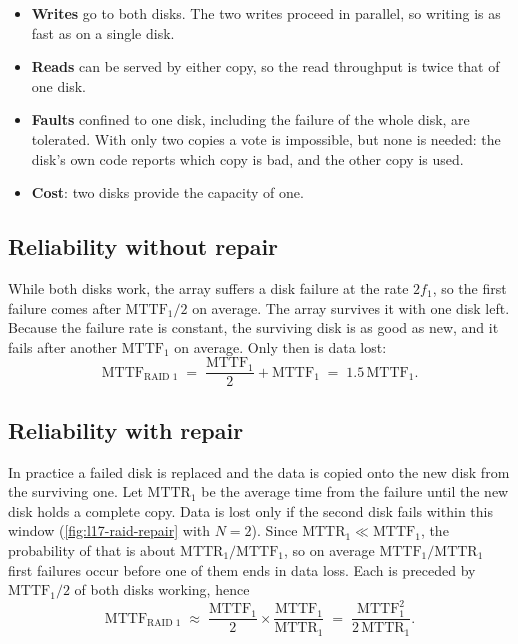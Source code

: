 \documentclass[../main.tex]{subfiles}
\begin{document}
\begin{itemize}
  \item \textbf{Writes} go to both disks.  The two writes proceed in parallel,
    so writing is as fast as on a single disk.
  \item \textbf{Reads} can be served by either copy, so the read throughput
    is twice that of one disk.
  \item \textbf{Faults} confined to one disk, including the failure of the
    whole disk, are tolerated.  With only two copies a vote is impossible,
    but none is needed: the disk's own code reports which copy is bad, and
    the other copy is used.
  \item \textbf{Cost}: two disks provide the capacity of one.
\end{itemize}

\subsection{Reliability without repair}

While both disks work, the array suffers a disk failure at the rate $2f_1$,
so the first failure comes after $\mathrm{MTTF}_1/2$ on average.  The array
survives it with one disk left.  Because the failure rate is constant, the
surviving disk is as good as new, and it fails after another
$\mathrm{MTTF}_1$ on average.  Only then is data lost:
\begin{equation}
  \mathrm{MTTF}_{\text{RAID 1}} \;=\; \frac{\mathrm{MTTF}_1}{2} + \mathrm{MTTF}_1
  \;=\; 1.5\,\mathrm{MTTF}_1 .
  \label{eq:l17-raid1-norepair}
\end{equation}

\subsection{Reliability with repair}

In practice a failed disk is replaced and the data is copied onto the new
disk from the surviving one.  Let $\mathrm{MTTR}_1$ be the average time from
the failure until the new disk holds a complete copy.  Data is lost only if
the second disk fails within this window (\cref{fig:l17-raid-repair} with
$N=2$).  Since $\mathrm{MTTR}_1 \ll \mathrm{MTTF}_1$, the probability of that
is about $\mathrm{MTTR}_1/\mathrm{MTTF}_1$, so on average
$\mathrm{MTTF}_1/\mathrm{MTTR}_1$ first failures occur before one of them
ends in data loss.  Each is preceded by $\mathrm{MTTF}_1/2$ of both disks
working, hence
\begin{equation}
  \mathrm{MTTF}_{\text{RAID 1}} \;\approx\;
  \frac{\mathrm{MTTF}_1}{2} \times \frac{\mathrm{MTTF}_1}{\mathrm{MTTR}_1}
  \;=\; \frac{\mathrm{MTTF}_1^2}{2\,\mathrm{MTTR}_1} .
  \label{eq:l17-raid1-repair}
\end{equation}
\end{document}

